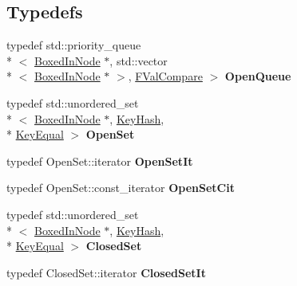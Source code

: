\subsection*{Typedefs}
\begin{DoxyCompactItemize}
\item 
\hypertarget{namespaceboxedin_a4354e19fe0fd28e8d5d66327f15d211c}{typedef std\+::priority\+\_\+queue\\*
$<$ \hyperlink{classboxedin_1_1BoxedInNode}{Boxed\+In\+Node} $\ast$, std\+::vector\\*
$<$ \hyperlink{classboxedin_1_1BoxedInNode}{Boxed\+In\+Node} $\ast$ $>$, \hyperlink{structboxedin_1_1FValCompare}{F\+Val\+Compare} $>$ {\bfseries Open\+Queue}}\label{namespaceboxedin_a4354e19fe0fd28e8d5d66327f15d211c}

\item 
\hypertarget{namespaceboxedin_a888729f0b16fedf98067249ac46993ae}{typedef std\+::unordered\+\_\+set\\*
$<$ \hyperlink{classboxedin_1_1BoxedInNode}{Boxed\+In\+Node} $\ast$, \hyperlink{structboxedin_1_1KeyHash}{Key\+Hash}, \\*
\hyperlink{structboxedin_1_1KeyEqual}{Key\+Equal} $>$ {\bfseries Open\+Set}}\label{namespaceboxedin_a888729f0b16fedf98067249ac46993ae}

\item 
\hypertarget{namespaceboxedin_a014c99b2c3e8412cc37e38f9c9a67d70}{typedef Open\+Set\+::iterator {\bfseries Open\+Set\+It}}\label{namespaceboxedin_a014c99b2c3e8412cc37e38f9c9a67d70}

\item 
\hypertarget{namespaceboxedin_aaa54ec0d6b1d6c4904d144904e444f80}{typedef Open\+Set\+::const\+\_\+iterator {\bfseries Open\+Set\+Cit}}\label{namespaceboxedin_aaa54ec0d6b1d6c4904d144904e444f80}

\item 
\hypertarget{namespaceboxedin_aba48e926d3e0b5f5aacce0e7a17f4713}{typedef std\+::unordered\+\_\+set\\*
$<$ \hyperlink{classboxedin_1_1BoxedInNode}{Boxed\+In\+Node} $\ast$, \hyperlink{structboxedin_1_1KeyHash}{Key\+Hash}, \\*
\hyperlink{structboxedin_1_1KeyEqual}{Key\+Equal} $>$ {\bfseries Closed\+Set}}\label{namespaceboxedin_aba48e926d3e0b5f5aacce0e7a17f4713}

\item 
\hypertarget{namespaceboxedin_a36cac0025dc6615566ab2a92fe7a3320}{typedef Closed\+Set\+::iterator {\bfseries Closed\+Set\+It}}\label{namespaceboxedin_a36cac0025dc6615566ab2a92fe7a3320}


\end{DoxyCompactItemize}
